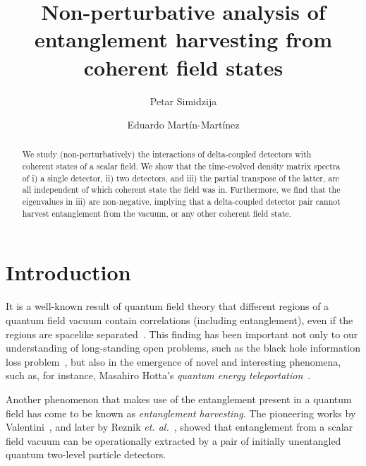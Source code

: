 \documentclass[pra,nofootinbib,floats,aps,twocolumn,tightenlines,superscriptaddress]{revtex4-1}
\begin{document}
	
	
\title{Non-perturbative analysis of entanglement harvesting from coherent field states}
	
\author{Petar Simidzija}	
	
\author{Eduardo Mart\'in-Mart\'inez}
	

\begin{abstract}
We study (non-perturbatively) the interactions of delta-coupled detectors with coherent states of a scalar field. We show that the time-evolved density matrix spectra of i) a single detector, ii) two detectors, and iii) the partial transpose of the latter, are all independent of which coherent state the field was in. Furthermore, we find that the eigenvalues in iii) are non-negative, implying that a delta-coupled detector pair cannot harvest entanglement from the vacuum, or any other coherent field state.
\end{abstract}
	
\maketitle
	
\section{Introduction}
\label{sec:intro}


It is a well-known result of quantum field theory that different regions of a quantum field vacuum contain correlations (including  entanglement), even if the regions are spacelike separated~\cite{Summers1985,Summers1987}. This finding has been important not only to our understanding of long-standing open problems, such as the black hole information loss problem~\cite{Preskill1992}, but also in the emergence of novel and interesting phenomena, such as, for instance, Masahiro Hotta's \textit{quantum energy teleportation}~\cite{Hotta2008,Hotta2009,Frey2014}. 

Another phenomenon that makes use of the entanglement present in a quantum field has come to be known as \textit{entanglement harvesting}. The pioneering works by Valentini~\cite{Valentini1991}, and later by Reznik \textit{et. al.}~\cite{Reznik2003,Reznik2005}, showed that entanglement from a scalar field vacuum can be operationally extracted by a pair of initially unentangled quantum two-level  particle detectors.
\end{document}
